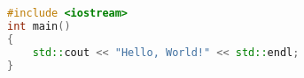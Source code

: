 \documentclass{ctexart}
\begin{document}
\begin{lstlisting}[language=c++]
#include <iostream>
int main()
{
    std::cout << "Hello, World!" << std::endl;
}
\end{lstlisting}
\end{document}
